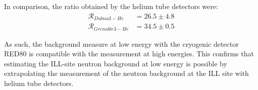  In comparison, the ratio obtained by the helium tube detectors were:
\begin{equation}
\begin{array}{cc}
\mathcal{R}_{Dubna 3-He} &= 26.5 \pm 4.8 \\
\mathcal{R}_{Grenoble 3-He} &= 34.5 \pm 0.5
\end{array}
\end{equation}

As such, the background measure at low energy with the cryogenic detector RED80 is compatible with the measurement at high energies. This confirms that estimating the ILL-site neutron background at low energy is possible by extrapolating the measurement of the neutron background at the ILL site with helium tube detectors.



%


%
%

